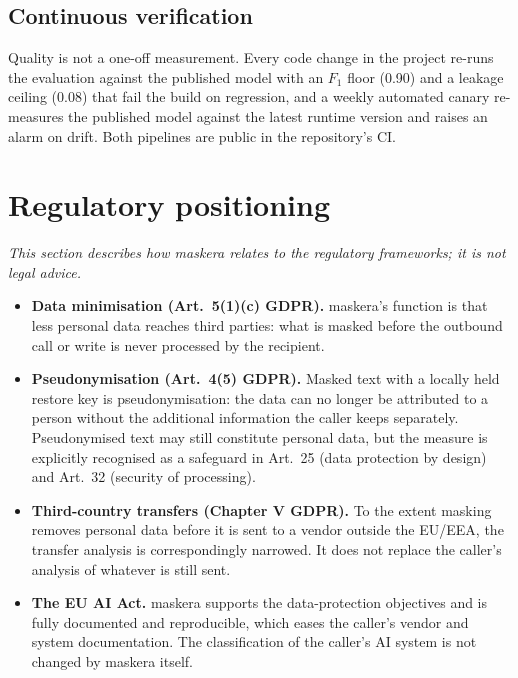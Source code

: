 \documentclass[10pt,a4paper]{article}
\begin{document}
\subsection{Continuous verification}

Quality is not a one-off measurement. Every code change in the project
re-runs the evaluation against the published model with an $F_1$ floor
(0.90) and a leakage ceiling (0.08) that fail the build on regression, and a
weekly automated canary re-measures the published model against the latest
runtime version and raises an alarm on drift. Both pipelines are public in
the repository's CI.

\section{Regulatory positioning}

\emph{This section describes how maskera relates to the regulatory
frameworks; it is not legal advice.}

\par\medskip
\begin{itemize}
  \item \textbf{Data minimisation (Art.\ 5(1)(c) GDPR).} maskera's function
        is that less personal data reaches third parties: what is masked
        before the outbound call or write is never processed by the
        recipient.
  \item \textbf{Pseudonymisation (Art.\ 4(5) GDPR).} Masked text with a
        locally held restore key is pseudonymisation: the data can no longer
        be attributed to a person without the additional information the
        caller keeps separately. Pseudonymised text may still constitute
        personal data, but the measure is explicitly recognised as a
        safeguard in Art.\ 25 (data protection by design) and Art.\ 32
        (security of processing).
  \item \textbf{Third-country transfers (Chapter V GDPR).} To the extent
        masking removes personal data before it is sent to a vendor outside
        the EU/EEA, the transfer analysis is correspondingly narrowed. It
        does not replace the caller's analysis of whatever is still sent.
  \item \textbf{The EU AI Act.} maskera supports the data-protection
        objectives and is fully documented and reproducible, which eases the
        caller's vendor and system documentation. The classification of the
        caller's AI system is not changed by maskera itself.
\end{itemize}
\end{document}
